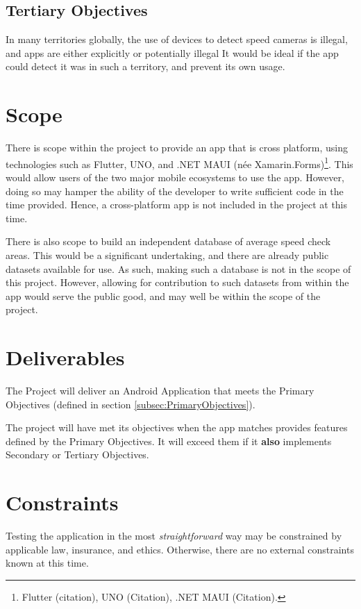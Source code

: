 \documentclass[11pt, a4paper, notitlepage]{report}
\begin{document}
\subsection{Tertiary Objectives}
In many territories globally, the use of devices to detect speed cameras is 
illegal, and apps are either explicitly or potentially illegal %
It would be ideal if the app could detect it was in such a territory, and 
prevent its own usage.

\section{Scope}\label{sec:Scope}
There is scope within the project to provide an app that is cross platform, 
using technologies such as Flutter, UNO, and .NET MAUI (née 
Xamarin.Forms)\footnote{Flutter (citation), UNO (Citation), .NET MAUI 
(Citation).}. This would allow users of the two major mobile ecosystems to use 
the app. However, doing so may hamper the ability of the developer to write 
sufficient code in the time provided. Hence, a cross-platform app is not 
included in the project at this time.

There is also scope to build an independent database of average speed check 
areas. This would be a significant undertaking, and there are already public 
datasets available for use. As such, making such a database is not in the scope 
of this project. However, allowing for contribution to such datasets from 
within the app would serve the public good, and may well be within the scope of 
the project.

\section{Deliverables}
The Project will deliver an Android Application that meets the Primary 
Objectives (defined in section \ref{subsec:PrimaryObjectives}).

The project will have met its objectives when the app matches provides features 
defined by the Primary Objectives. It will exceed them if it \textbf{also} 
implements Secondary or Tertiary Objectives.

\section{Constraints}
Testing the application in the most \textit{straightforward} way may be 
constrained by applicable law, insurance, and ethics. Otherwise, there are no 
external constraints known at this time.
\end{document}
